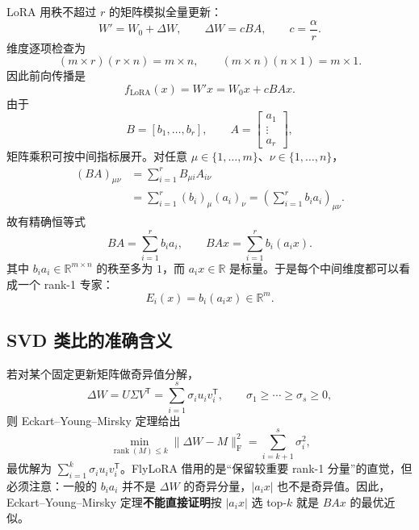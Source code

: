 \documentclass[11pt]{article}
\numberwithin{equation}{section}
\newcommand{\R}{\mathbb{R}}
\newcommand{\1}{\mathbf{1}}
\newcommand{\F}{\mathrm{F}}
\begin{document}
LoRA 用秩不超过 $r$ 的矩阵模拟全量更新：
\begin{equation}
  W'=W_0+\Delta W,
  \qquad
  \Delta W=cBA,
  \qquad c=\frac{\alpha}{r}.
  \label{eq:lora-weight}
\end{equation}
维度逐项检查为
\begin{equation}
  (m\times r)(r\times n)=m\times n,
  \qquad
  (m\times n)(n\times 1)=m\times 1.
\end{equation}
因此前向传播是
\begin{equation}
  f_{\mathrm{LoRA}}(x)
  =W'x
  =W_0x+cBAx.
  \label{eq:lora-forward}
\end{equation}
由于
\begin{equation}
  B=[b_1,\ldots,b_r],
  \qquad
  A=\begin{bmatrix}a_1\\ \vdots\\ a_r\end{bmatrix},
\end{equation}
矩阵乘积可按中间指标展开。对任意 $\mu\in\{1,\ldots,m\}$、$\nu\in\{1,\ldots,n\}$，
\begin{align}
  (BA)_{\mu\nu}
  &=\sum_{i=1}^{r}B_{\mu i}A_{i\nu} \\
  &=\sum_{i=1}^{r}(b_i)_\mu(a_i)_\nu
  =\left(\sum_{i=1}^{r}b_i a_i\right)_{\mu\nu}.
\end{align}
故有精确恒等式
\begin{equation}
  BA=\sum_{i=1}^{r}b_i a_i,
  \qquad
  BAx=\sum_{i=1}^{r}b_i(a_i x).
  \label{eq:rank-one-sum}
\end{equation}
其中 $b_i a_i\in\R^{m\times n}$ 的秩至多为 $1$，而 $a_i x\in\R$ 是标量。于是每个中间维度都可以看成一个 rank-1 专家：
\begin{equation}
  E_i(x)=b_i(a_i x)\in\R^m.
\end{equation}

\subsection{SVD 类比的准确含义}

若对某个固定更新矩阵做奇异值分解，
\begin{equation}
  \Delta W=U\Sigma V^{\mathsf{T}}
  =\sum_{i=1}^{s}\sigma_i u_i v_i^{\mathsf{T}},
  \qquad
  \sigma_1\ge\cdots\ge\sigma_s\ge 0,
\end{equation}
则 Eckart--Young--Mirsky 定理给出
\begin{equation}
  \underset{\operatorname{rank}(M)\le k}{\min}
  \|\Delta W-M\|_\F^2
  =\sum_{i=k+1}^{s}\sigma_i^2,
\end{equation}
最优解为 $\sum_{i=1}^{k}\sigma_i u_i v_i^{\mathsf{T}}$。FlyLoRA 借用的是“保留较重要 rank-1 分量”的直觉，但必须注意：一般的 $b_i a_i$ 并不是 $\Delta W$ 的奇异分量，$|a_i x|$ 也不是奇异值。因此，Eckart--Young--Mirsky 定理\textbf{不能直接证明}按 $|a_i x|$ 选 top-$k$ 就是 $BAx$ 的最优近似。
\end{document}

